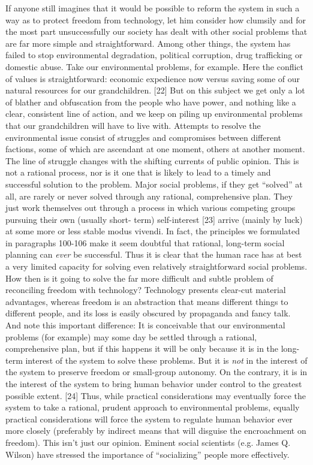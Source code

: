  If anyone still imagines that it would be possible to reform the system in such a way as to protect freedom from technology, let him consider how clumsily and for the most part unsuccessfully our society has dealt with other social problems that are far more simple and straightforward. Among other things, the system has failed to stop environmental degradation, political corruption, drug trafficking or domestic abuse.
 Take our environmental problems, for example. Here the conflict of values is straightforward: economic expedience now versus saving some of our natural resources for our grandchildren. [22] But on this subject we get only a lot of blather and obfuscation from the people who have power, and nothing like a clear, consistent line of action, and we keep on piling up environmental problems that our grandchildren will have to live with. Attempts to resolve the environmental issue consist of struggles and compromises between different factions, some of which are ascendant at one moment, others at another moment. The line of struggle changes with the shifting currents of public opinion. This is not a rational process, nor is it one that is likely to lead to a timely and successful solution to the problem. Major social problems, if they get “solved” at all, are rarely or never solved through any rational, comprehensive plan. They just work themselves out through a process in which various competing groups pursuing their own (usually short- term) self-interest [23] arrive (mainly by luck) at some more or less stable modus vivendi. In fact, the principles we formulated in paragraphs 100-106 make it seem doubtful that rational, long-term social planning can {\em ever} be successful.\break
{} Thus it is clear that the human race has at best a very limited capacity for solving even relatively straightforward social problems. How then is it going to solve the far more difficult and subtle problem of reconciling freedom with technology? Technology presents clear-cut material advantages, whereas freedom is an abstraction that means different things to different people, and its loss is easily obscured by propaganda and fancy talk.\break
{} And note this important difference: It is conceivable that our environmental problems (for example) may some day be settled through a rational, comprehensive plan, but if this happens it will be only because it is in the long-term interest of the system to solve these problems. But it is {\em not} in the interest of the system to preserve freedom or small-group autonomy. On the contrary, it is in the interest of the system to bring human behavior under control to the greatest possible extent. [24] Thus, while practical considerations may eventually force the system to take a rational, prudent approach to environmental problems, equally practical considerations will force the system to regulate human behavior ever more closely (preferably by indirect means that will disguise the encroachment on freedom). This isn’t just our opinion. Eminent social scientists (e.g. James Q. Wilson) have stressed the importance of “socializing” people more effectively.

